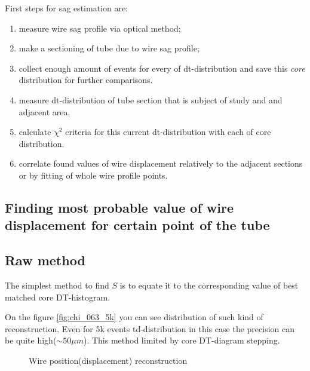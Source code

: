 	First steps for sag estimation are:
	\begin{enumerate}
	\item measure wire sag profile via optical method;	
	\item make a sectioning of tube due to wire sag profile;
	\item collect enough amount of events for every of dt-distribution and save this {\it core} distribution for further comparisons.
	\item measure dt-distribution of tube section that is subject of study and and adjacent area.
	\item calculate $\chi^2$ criteria for this current dt-distribution with each of core distribution.
	\item correlate found values of wire displacement relatively to the adjacent sections or by fitting of whole wire profile points.
	\end{enumerate}

	\subsection{Finding most probable value of wire displacement for certain point of the tube}
	
	\subsection{Raw method}
	The simplest method to find $S$ is to equate it to the corresponding value of best matched core DT-histogram.
	
	On the figure \ref{fig:chi_063_5k}  you can see distribution of such kind of reconstruction. Even for 5k events td-distribution in this case the precision can be quite high($\sim 50 \mu m$). This method limited by core DT-diagram stepping.
	
	\begin{figure}[h!]
		\centering
		\qquad
		\caption{Wire position(displacement) reconstruction}			
	\end{figure}	
	
